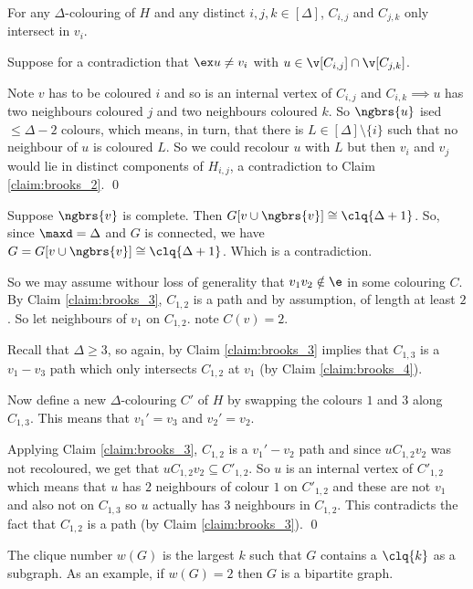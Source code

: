 \begin{prf}
\begin{itemize}
\begin{prf}
        \end{prf}
        \begin{customclaim}{4}
        \label{claim:brooks_4}
            For any $\Delta$-colouring of $H$ and any distinct $i, j, k \in [\Delta]$, $C_{i, j}$ and $C_{j, k}$ only intersect in $v_i$.
        \end{customclaim}
        \begin{prf}
            Suppose for a contradiction that $\ex u \neq v_i$ with $u \in \v[C_{i, j}] \cap \v[C_{j, k}]$.

            Note $v$ has to be coloured $i$ and so is an internal vertex of $C_{i, j}$ and $C_{i, k} \implies u$ has two neighbours coloured $j$ and two neighbours coloured $k$. So $\ngbrs{u}$ ised $\leq \Delta - 2$ colours, which means, in turn, that there is $L \in [\Delta] \setminus \{i\}$ such that no neighbour of $u$ is coloured $L$. So we could recolour $u$ with $L$ but then $v_i$ and $v_j$ would lie in distinct components of $H_{i, j}$, a contradiction to Claim \ref{claim:brooks_2}. \qed
        \end{prf}
        Suppose $\ngbrs{v}$ is complete. Then $G[v \cup \ngbrs{v}] \cong \clq{\Delta + 1}$. So, since $\maxd = \Delta$ and $G$ is connected, we have $G = G[v \cup \ngbrs{v}] \cong \clq{\Delta + 1}$. Which is a contradiction.

        So we may assume withour loss of generality that $v_1v_2 \notin \e$ in some colouring $C$. By Claim \ref{claim:brooks_3}, $C_{1, 2}$ is a path and by assumption, of length at least $2$. So let neighbours of $v_1$ on $C_{1, 2}$. note $C(v) = 2$.

        Recall that $\Delta \geq 3$, so again, by Claim \ref{claim:brooks_3} implies that $C_{1, 3}$ is a $v_1 - v_3$ path which only intersects $C_{1, 2}$ at $v_1$ (by Claim \ref{claim:brooks_4}).

        Now define a new $\Delta$-colouring $C'$ of $H$ by swapping the colours $1$ and $3$ along $C_{1, 3}$. This means that $v_1' = v_3$ and $v_2' = v_2$.

        Applying Claim \ref{claim:brooks_3}, $C_{1, 2}$ is a $v_1' - v_2$ path and since $uC_{1, 2}v_2$ was not recoloured, we get that $uC_{1, 2}v_2 \subseteq C'_{1, 2}$. So $u$ is an internal vertex of $C'_{1, 2}$ which means that $u$ has $2$ neighbours of colour $1$ on $C'_{1, 2}$ and these are not $v_1$ and also not on $C_{1, 3}$ so $u$ actually has $3$ neighbours in $C_{1, 2}$. This contradicts the fact that $C_{1, 2}$ is a path (by Claim \ref{claim:brooks_3}). \qed
    \end{itemize}
\end{prf}
\noindent The clique number $w(G)$ is the largest $k$ such that $G$ contains a $\clq{k}$ as a subgraph. As an example, if $w(G) = 2$ then $G$ is a bipartite graph.

